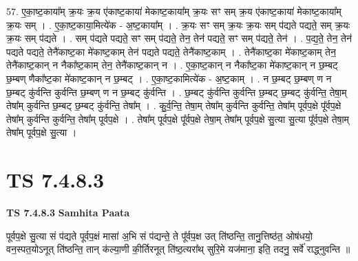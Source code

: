 \documentclass[17pt]{extarticle}
\begin{document}
57. ए॒का॒ष्ट॒काया᳚म् क्र॒यः क्र॒य ए॑काष्ट॒काया॑ मेकाष्ट॒काया᳚म् क्र॒यः सꣳ सम् क्र॒य ए॑काष्ट॒काया॑ मेकाष्ट॒काया᳚म् क्र॒यः सम् । . ए॒का॒ष्ट॒काया॒मित्ये॑क - अ॒ष्ट॒काया᳚म् । . क्र॒यः सꣳ सम् क्र॒यः क्र॒यः सम् प॑द्यते पद्यते॒ सम् क्र॒यः क्र॒यः सम् प॑द्यते । . सम् प॑द्यते पद्यते॒ सꣳ सम् प॑द्यते॒ तेन॒ तेन॑ पद्यते॒ सꣳ सम् प॑द्यते॒ तेन॑ । . प॒द्य॒ते॒ तेन॒ तेन॑ पद्यते पद्यते॒ तेनै॑काष्ट॒का मे॑काष्ट॒काम् तेन॑ पद्यते पद्यते॒ तेनै॑काष्ट॒काम् । . तेनै॑काष्ट॒का मे॑काष्ट॒काम् तेन॒ तेनै॑काष्ट॒कान् न नैका᳚ष्ट॒काम् तेन॒ तेनै॑काष्ट॒कान् न । . ए॒का॒ष्ट॒कान् न नैका᳚ष्ट॒का मे॑काष्ट॒कान् न छ॒म्बट् छ॒म्बण् णैका᳚ष्ट॒का मे॑काष्ट॒कान् न छ॒म्बट् । . ए॒का॒ष्ट॒कामित्ये॑क - अ॒ष्ट॒काम् । . न छ॒म्बट् छ॒म्बण् ण न छ॒म्बट् कु॑र्वन्ति कुर्वन्ति छ॒म्बण् ण न छ॒म्बट् कु॑र्वन्ति । . छ॒म्बट् कु॑र्वन्ति कुर्वन्ति छ॒म्बट् छ॒म्बट् कु॑र्वन्ति॒ तेषा॒म् तेषा᳚म् कुर्वन्ति छ॒म्बट् छ॒म्बट् कु॑र्वन्ति॒ तेषा᳚म् । . कु॒र्व॒न्ति॒ तेषा॒म् तेषा᳚म् कुर्वन्ति कुर्वन्ति॒ तेषा᳚म् पूर्वप॒क्षे पू᳚र्वप॒क्षे तेषा᳚म् कुर्वन्ति कुर्वन्ति॒ तेषा᳚म् पूर्वप॒क्षे । . तेषा᳚म् पूर्वप॒क्षे पू᳚र्वप॒क्षे तेषा॒म् तेषा᳚म् पूर्वप॒क्षे सु॒त्या सु॒त्या पू᳚र्वप॒क्षे तेषा॒म् तेषा᳚म् पूर्वप॒क्षे सु॒त्या । \newline
\pagebreak
{}

\section{ TS 7.4.8.3 }

\textbf{TS 7.4.8.3 } \newline
\textbf{Samhita Paata} \newline

पूर्वप॒क्षे सु॒त्या सं प॑द्यते पूर्वप॒क्षं मासा॑ अ॒भि सं प॑द्यन्ते॒ ते पू᳚र्वप॒क्ष उत् ति॑ष्ठन्ति॒ तानु॒त्तिष्ठ॑त॒ ओष॑धयो॒ वन॒स्पत॒योऽनूत् ति॑ष्ठन्ति॒ तान् क॑ल्या॒णी की॒र्तिरनूत् ति॑ष्ठ॒त्यरा᳚थ् सुरि॒मे यज॑माना॒ इति॒ तदनु॒ सर्वे॑ राद्ध्नुवन्ति ॥ \newline
\end{document}
